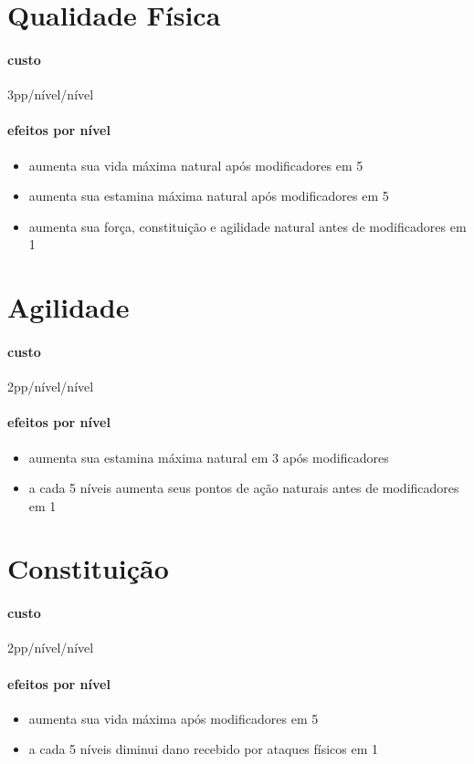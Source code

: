 \section{Qualidade Física}
\paragraph{custo} 3pp/nível/nível
\paragraph{efeitos por nível} 
\begin{itemize}
    \item aumenta sua vida máxima natural após modificadores em 5
    \item aumenta sua estamina máxima natural após modificadores em 5
    \item aumenta sua força, constituição e agilidade natural antes de modificadores em 1
\end{itemize}
%
%
\section{Agilidade}
\paragraph{custo} 2pp/nível/nível
\paragraph{efeitos por nível} 
\begin{itemize}
  \item aumenta sua estamina máxima natural em 3 após modificadores
  \item a cada 5 níveis aumenta seus pontos de ação naturais antes de modificadores em 1
\end{itemize}
%
%
\section{Constituição}
\paragraph{custo} 2pp/nível/nível
\paragraph{efeitos por nível} 
\begin{itemize}
  \item aumenta sua vida máxima após modificadores em 5
  \item a cada 5 níveis diminui dano recebido por ataques físicos em 1 
\end{itemize}
%
%
